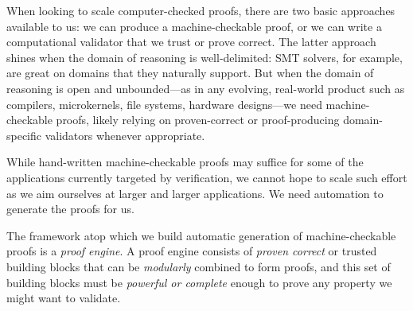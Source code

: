 \documentclass[sn-mathphys,pdflatex]{sn-jnl}%
\theoremstyle{thmstyleone}%
\theoremstyle{thmstyletwo}%
\theoremstyle{thmstylethree}%
\begin{document}
%

When looking to scale computer-checked proofs, there are two basic approaches available to us: we can produce a machine-checkable proof, or we can write a computational validator that we trust or prove correct.
The latter approach shines when the domain of reasoning is well-delimited: SMT solvers, for example, are great on domains that they naturally support.
But when the domain of reasoning is open and unbounded---as in any evolving, real-world product such as compilers, microkernels, file systems, hardware designs---we need machine-checkable proofs, likely relying on proven-correct or proof-producing domain-specific validators whenever appropriate.

While hand-written machine-checkable proofs may suffice for some of the applications currently targeted by verification, we cannot hope to scale such effort as we aim ourselves at larger and larger applications.
We need automation to generate the proofs for us.

The framework atop which we build automatic generation of machine-checkable proofs is a \emph{proof engine}.
A proof engine consists of \emph{proven correct} or trusted building blocks that can be \emph{modularly} combined to form proofs, and this set of building blocks must be \emph{powerful or complete} enough to prove any property we might want to validate.
\end{document}

